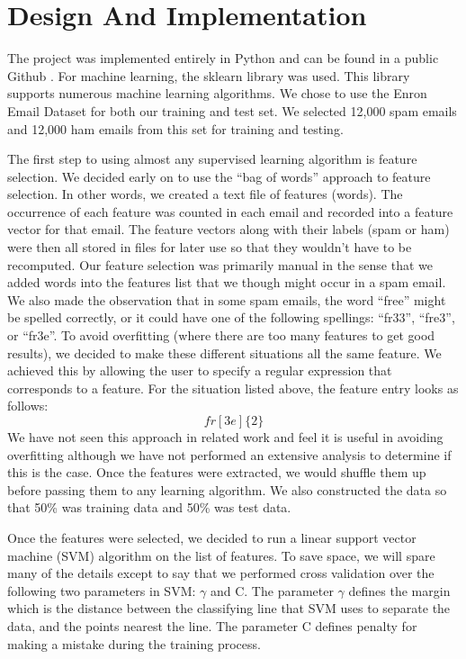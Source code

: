 \section{Design And Implementation}
The project was implemented entirely in Python and can be found in a public Github \cite{projectCode}. For machine learning, the sklearn library \cite{sklearn} was used. This library supports numerous machine learning algorithms. We chose to use the Enron Email Dataset \cite{enron} for both our training and test set. We selected 12,000 spam emails and 12,000 ham emails from this set for training and testing. 

The first step to using almost any supervised learning algorithm is feature selection. We decided early on to use the ``bag of words'' approach to feature selection. In other words, we created a text file of features (words). The occurrence of each feature was counted in each email and recorded into a feature vector for that email. The feature vectors along with their labels (spam or ham) were then all stored in files for later use so that they wouldn't have to be recomputed. Our feature selection was primarily manual in the sense that we added words into the features list that we though might occur in a spam email. We also made the observation that in some spam emails, the word ``free'' might be spelled correctly, or it could have one of the following spellings: ``fr33'', ``fre3'', or ``fr3e''. To avoid overfitting (where there are too many features to get good results), we decided to make these different situations all the same feature. We achieved this by allowing the user to specify a regular expression that corresponds to a feature. For the situation listed above, the feature entry looks as follows: 
$$fr[3e]\{2\}$$
We have not seen this approach in related work and feel it is useful in avoiding overfitting although we have not performed an extensive analysis to determine if this is the case. Once the features were extracted, we would shuffle them up before passing them to any learning algorithm. We also constructed the data so that 50\% was training data and 50\% was test data.

Once the features were selected, we decided to run a linear support vector machine (SVM) algorithm on the list of features. To save space, we will spare many of the details except to say that we performed cross validation over the following two parameters in SVM: $\gamma$ and C. The parameter $\gamma$ defines the margin which is the distance between the classifying line that SVM uses to separate the data, and the points nearest the line. The parameter C defines penalty for making a mistake during the training process.

